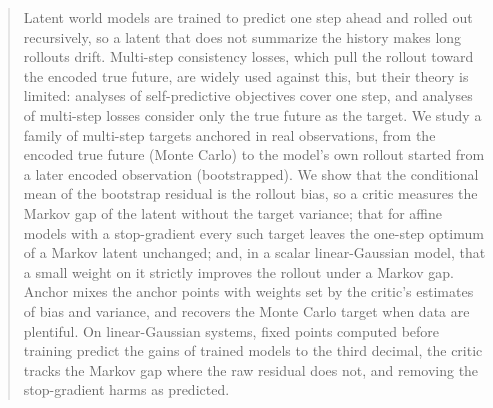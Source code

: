 \begin{abstract}
Latent world models are trained to predict one step ahead and rolled out recursively, so a latent that does not summarize the history makes long rollouts drift.
Multi-step consistency losses, which pull the rollout toward the encoded true future, are widely used against this, but their theory is limited: analyses of self-predictive objectives cover one step, and analyses of multi-step losses consider only the true future as the target.
We study a family of multi-step targets anchored in real observations, from the encoded true future (Monte Carlo) to the model's own rollout started from a later encoded observation (bootstrapped).
We show that the conditional mean of the bootstrap residual is the rollout bias, so a critic measures the Markov gap of the latent without the target variance; that for affine models with a stop-gradient every such target leaves the one-step optimum of a Markov latent unchanged; and, in a scalar linear-Gaussian model, that a small weight on it strictly improves the rollout under a Markov gap.
Anchor mixes the anchor points with weights set by the critic's estimates of bias and variance, and recovers the Monte Carlo target when data are plentiful.
On linear-Gaussian systems, fixed points computed before training predict the gains of trained models to the third decimal, the critic tracks the Markov gap where the raw residual does not, and removing the stop-gradient harms as predicted.
\end{abstract}
